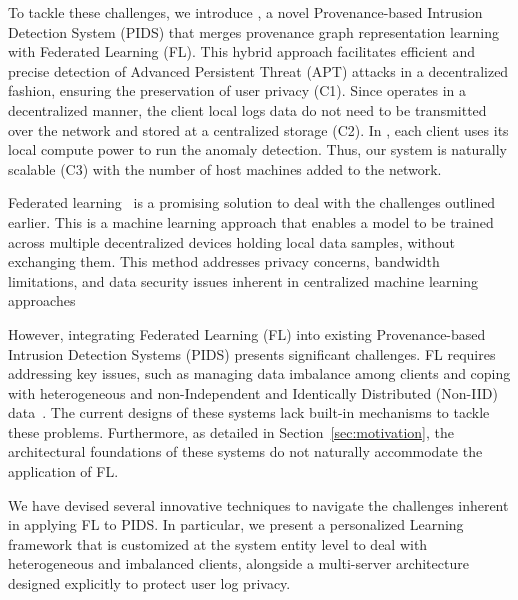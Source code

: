 
To tackle these challenges, we introduce \Sys, a novel Provenance-based Intrusion Detection System (PIDS) that merges provenance graph representation learning with Federated Learning (FL). This hybrid approach facilitates efficient and precise detection of Advanced Persistent Threat (APT) attacks in a decentralized fashion, ensuring the preservation of user privacy (C1). Since \Sys operates in a decentralized manner, the client local logs data do not need to be transmitted over the network and stored at a centralized storage (C2). In \Sys, each client uses its local compute power to run the \Sys anomaly detection. Thus, our system is naturally scalable (C3) with the number of host machines added to the network.


Federated learning~\cite{mcmahan2017communication} is a promising solution to deal with the challenges outlined earlier. This is a machine learning approach that enables a model to be trained across multiple decentralized devices holding local data samples, without exchanging them. This method addresses privacy concerns, bandwidth limitations, and data security issues inherent in centralized machine learning approaches


However, integrating Federated Learning (FL) into existing Provenance-based Intrusion Detection Systems (PIDS) presents significant challenges. FL requires addressing key issues, such as managing data imbalance among clients and coping with heterogeneous and non-Independent and Identically Distributed (Non-IID) data~\cite{zhao2018federated}. The current designs of these systems lack built-in mechanisms to tackle these problems. Furthermore, as detailed in Section~\ref{sec:motivation}, the architectural foundations of these systems do not naturally accommodate the application of FL.

We have devised several innovative  techniques to navigate the challenges inherent in applying FL to PIDS. In particular, we present a personalized \gnnshort Learning framework that is customized at the system entity level to deal with heterogeneous and imbalanced clients, alongside a multi-server architecture designed explicitly to protect user log privacy.


